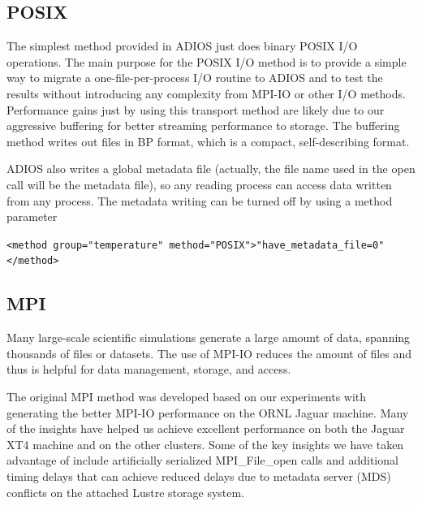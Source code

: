 \subsection{POSIX}

The simplest method provided in ADIOS just does binary POSIX I/O operations. 
The main purpose for the POSIX I/O method is to provide a simple way to migrate 
a one-file-per-process I/O routine to ADIOS and to test the results without introducing 
any complexity from MPI-IO or other I/O methods. Performance gains just by using 
this transport method are likely due to our aggressive buffering for better streaming 
performance to storage. The buffering method writes out files in BP format, which 
is a compact, self-describing format.

ADIOS also writes a global metadata file (actually, the file name used in the open call
will be the metadata file), so any reading process can access data written from any process.
The metadata writing can be turned off by using a method parameter

\verb+<method group="temperature" method="POSIX">"have_metadata_file=0"</method>+


\subsection{MPI}

Many large-scale scientific simulations generate a large amount of data, spanning 
thousands of files or datasets. The use of MPI-IO reduces the amount of files and 
thus is helpful for data management, storage, and access. 

The original MPI method was developed based on our experiments with generating 
the better MPI-IO performance on the ORNL Jaguar machine. Many of the insights 
have helped us achieve excellent performance on both the Jaguar XT4 machine and 
on the other clusters. Some of the key insights we have taken advantage of include 
artificially serialized MPI\_File\_open calls and additional timing delays that 
can achieve reduced delays due to metadata server (MDS) conflicts on the attached 
Lustre storage system.

